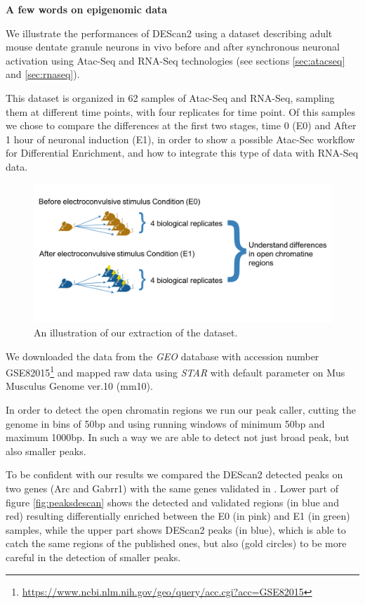 \textbf{A few words on epigenomic data}

We illustrate the performances of DEScan2 using a dataset \cite{Su2017} describing adult mouse dentate granule neurons in vivo before and after synchronous neuronal activation using Atac-Seq and RNA-Seq technologies (see sections \ref{sec:atacseq} and \ref{sec:rnaseq}).

This dataset is organized in 62 samples of Atac-Seq and RNA-Seq, sampling them at different time points, with four replicates for time point.
Of this samples we chose to compare the differences at the first two stages, time 0 (E0) and After 1 hour of neuronal induction (E1), in order to show a possible Atac-Sec workflow for Differential Enrichment, and how to integrate this type of data with RNA-Seq data.

\begin{figure}[H]
\includegraphics[width=\textwidth,height=\textheight,keepaspectratio]{img/descan2/dataset.png}
\caption[DEScan2 dataset illustration]{An illustration of our extraction of the \cite{Su2017} dataset.}
\label{fig:atacdataset}
\centering
\end{figure}

We downloaded the data from the \textit{GEO} database \cite{Edgar2002, Barrett2013} with accession number GSE82015\footnote{\url{https://www.ncbi.nlm.nih.gov/geo/query/acc.cgi?acc=GSE82015}} and mapped raw data using \textit{STAR} \cite{Dobin2013} with default parameter on Mus Musculus Genome ver.10 (mm10).

In order to detect the open chromatin regions we run our peak caller, cutting the genome in bins of 50bp and using running windows of minimum 50bp and maximum 1000bp. In such a way we are able to detect not just broad peak, but also smaller peaks.

To be confident with our results we compared the DEScan2 detected peaks on two genes (Arc and Gabrr1) with the same genes validated in \cite{Su2017}.
Lower part of figure \ref{fig:peaksdescan} shows the detected and validated regions (in blue and red) resulting differentially enriched between the E0 (in pink) and E1 (in green) samples, while the upper part shows DEScan2 peaks (in blue), which is able to catch the same regions of the published ones, but also (gold circles) to be more careful in the detection of smaller peaks.

